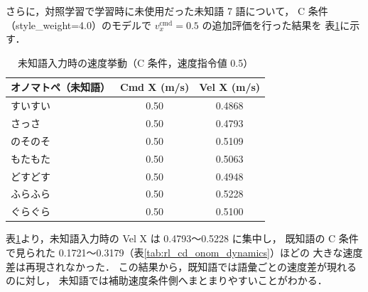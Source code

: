 さらに，対照学習で学習時に未使用だった未知語 7 語について，
C 条件（style\_weight=4.0）のモデルで
$v_x^{\mathrm{cmd}}=0.5$ の追加評価を行った結果を
表\ref{tab:rl_c_unknown_onom_velx}に示す．

\begin{table}[H]
  \centering
  \caption{未知語入力時の速度挙動（C 条件，速度指令値 0.5）}
  \label{tab:rl_c_unknown_onom_velx}
  \small
  \begin{tabular}{lcc} \toprule
    \textbf{オノマトペ（未知語）} & \textbf{Cmd X (m/s)} & \textbf{Vel X (m/s)} \\ \midrule
    すいすい & 0.50 & 0.4868 \\
    さっさ & 0.50 & 0.4793 \\
    のそのそ & 0.50 & 0.5109 \\
    もたもた & 0.50 & 0.5063 \\
    どすどす & 0.50 & 0.4948 \\
    ふらふら & 0.50 & 0.5228 \\
    ぐらぐら & 0.50 & 0.5100 \\ \bottomrule
  \end{tabular}
\end{table}

表\ref{tab:rl_c_unknown_onom_velx}より，未知語入力時の Vel X は 0.4793〜0.5228 に集中し，
既知語の C 条件で見られた 0.1721〜0.3179（表\ref{tab:rl_cd_onom_dynamics}）ほどの
大きな速度差は再現されなかった．
この結果から，既知語では語彙ごとの速度差が現れるのに対し，
未知語では補助速度条件側へまとまりやすいことがわかる．

